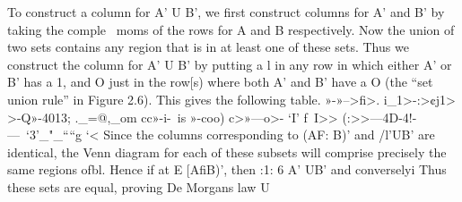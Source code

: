 \documentclass{beamer}
\begin{document}
To construct a column for A’ U B’, we ﬁrst construct columns for A’ and B’ by taking the comple~
moms of the rows for A and B respectively. Now the union of two sets contains any region that is
in at least one of these sets. Thus we construct the column for A’ U B’ by putting a l in any row
in which either A’ or B’ has a 1, and O just in the row[s) where both A’ and B’ have a O (the “set
union rule” in Figure 2.6). This gives the following table.
»-»--\oc>ﬁ>. i_1>-\<:>¢j1>
>-Q»-4013; ._=@,_om
cc»-i-\ is
»-coo)
c>»—o>- ‘I’
f\
I>>
(:>>—4D-4!-—\ ‘3’_"_““g
‘<
Since the columns corresponding to (AF: B)’ and /l’UB’ are identical, the Venn diagram for each of
these subsets will comprise precisely the same regions ofbl. Hence if at E [AﬁB)’, then :1: 6 A’ UB’
and converselyi Thus these sets are equal, proving De Morgans law  U
\end{document}
